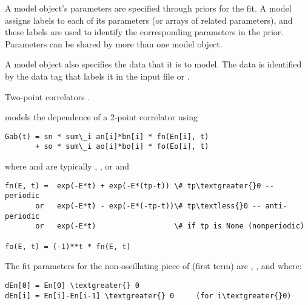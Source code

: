 \documentclass[letterpaper,10pt,english]{sphinxmanual}
\begin{document}
A model object's parameters are specified through priors for the fit. A
model assigns labels to each of its parameters (or arrays of related
parameters), and these labels are used to identify the corresponding
parameters in the prior. Parameters can be shared by more than one model
object.

A model object also specifies the data that it is to model. The data is
identified by the data tag that labels it in the input file or .

\begin{fulllineitems}
\label{corrfitter:corrfitter.Corr2}
Two-point correlators .

{\hyperref[corrfitter:corrfitter.Corr2]{}} models the  dependence of a 2-point correlator 
using

\begin{Verbatim}[commandchars=\\\{\}]
Gab(t) = sn * sum\_i an[i]*bn[i] * fn(En[i], t)
       + so * sum\_i ao[i]*bo[i] * fo(Eo[i], t)
\end{Verbatim}

where  and  are typically , , or  and

\begin{Verbatim}[commandchars=\\\{\}]
fn(E, t) =  exp(-E*t) + exp(-E*(tp-t)) \# tp\textgreater{}0 -- periodic
       or   exp(-E*t) - exp(-E*(-tp-t))\# tp\textless{}0 -- anti-periodic
       or   exp(-E*t)                  \# if tp is None (nonperiodic)

fo(E, t) = (-1)**t * fn(E, t)
\end{Verbatim}

The fit parameters for the non-oscillating piece of  (first term)
are , , and  where:

\begin{Verbatim}[commandchars=\\\{\}]
dEn[0] = En[0] \textgreater{} 0
dEn[i] = En[i]-En[i-1] \textgreater{} 0     (for i\textgreater{}0)
\end{Verbatim}


\end{fulllineitems}
\end{document}
